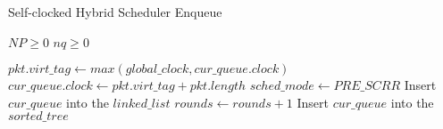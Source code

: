 \begin{algorithm}[t]
\caption{Self-clocked Hybrid Scheduler Enqueue}
\label{alg:hybrid-enq}
\begin{algorithmic}
\Require $NP \ge 0$
\Require $nq \ge 0$

\State $pkt.virt\_tag \gets max(global\_clock, cur\_queue.clock)$
\State $cur\_queue.clock \gets pkt.virt\_tag + pkt.length$
        \State $sched\_mode \gets PRE\_SCRR$       
    \EndIf
        \State Insert $cur\_queue$ into the $linked\_list$
        \State $rounds \gets rounds + 1$
    \Else
        \State Insert $cur\_queue$ into the $sorted\_tree$
    \EndIf
\EndIf

\EndFunction
\end{algorithmic}
\end{algorithm}
